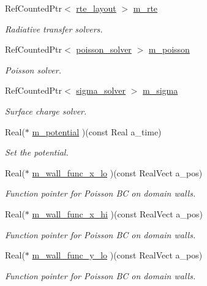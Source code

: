 \begin{DoxyCompactItemize}
Ref\+Counted\+Ptr$<$ \hyperlink{classrte__layout}{rte\+\_\+layout} $>$ \hyperlink{classtime__stepper_ace365dde5918ec979d191d19519afc1f}{m\+\_\+rte}
\begin{DoxyCompactList}\small\item\em Radiative transfer solvers. \end{DoxyCompactList}\item 
Ref\+Counted\+Ptr$<$ \hyperlink{classpoisson__solver}{poisson\+\_\+solver} $>$ \hyperlink{classtime__stepper_a86109da74846f40cabe5a940bf6ef360}{m\+\_\+poisson}
\begin{DoxyCompactList}\small\item\em Poisson solver. \end{DoxyCompactList}\item 
Ref\+Counted\+Ptr$<$ \hyperlink{classsigma__solver}{sigma\+\_\+solver} $>$ \hyperlink{classtime__stepper_aec0c61822a3a3bb1b4cdc06a6eaf1d5d}{m\+\_\+sigma}
\begin{DoxyCompactList}\small\item\em Surface charge solver. \end{DoxyCompactList}\item 
Real($\ast$ \hyperlink{classtime__stepper_a53923894761481d4f6fc1d226cd359b5}{m\+\_\+potential} )(const Real a\+\_\+time)
\begin{DoxyCompactList}\small\item\em Set the potential. \end{DoxyCompactList}\item 
Real($\ast$ \hyperlink{classtime__stepper_a54c0d0fabecde28d2ff02ff25385bf43}{m\+\_\+wall\+\_\+func\+\_\+x\+\_\+lo} )(const Real\+Vect a\+\_\+pos)
\begin{DoxyCompactList}\small\item\em Function pointer for Poisson BC on domain walls. \end{DoxyCompactList}\item 
Real($\ast$ \hyperlink{classtime__stepper_ad48ff9f55719c7412afeb182af186d7a}{m\+\_\+wall\+\_\+func\+\_\+x\+\_\+hi} )(const Real\+Vect a\+\_\+pos)
\begin{DoxyCompactList}\small\item\em Function pointer for Poisson BC on domain walls. \end{DoxyCompactList}\item 
Real($\ast$ \hyperlink{classtime__stepper_a18f009db00a27df1b1a0acfbf61df35f}{m\+\_\+wall\+\_\+func\+\_\+y\+\_\+lo} )(const Real\+Vect a\+\_\+pos)
\begin{DoxyCompactList}\small\item\em Function pointer for Poisson BC on domain walls. \end{DoxyCompactList}\item 

\end{DoxyCompactItemize}
